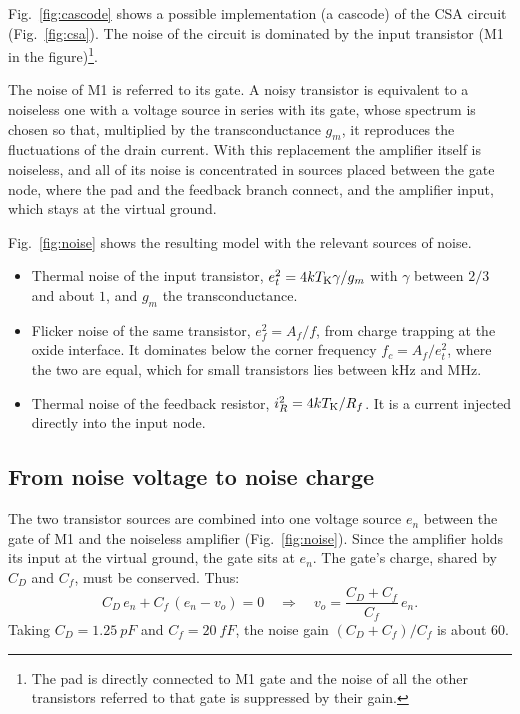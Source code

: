 \documentclass[11pt,a4paper]{article}
\newcommand{\CD}{\ensuremath{C_D}}
\newcommand{\Cf}{\ensuremath{C_f}}
\begin{document}
Fig.~\ref{fig:cascode} shows a possible implementation (a cascode) of the CSA circuit (Fig.~\ref{fig:csa}). 
The noise of
the circuit is dominated by the input transistor (M1 in the figure)\footnote{The
pad is directly connected to M1 gate and the noise of all the other transistors
referred to that gate is suppressed by their
gain.}.

The noise of M1 is referred to its gate. A noisy transistor is equivalent
to a noiseless one with a voltage source in series with its gate, whose
spectrum is chosen so that, multiplied by the transconductance $g_m$, it
reproduces the fluctuations of the drain current. With this replacement
the amplifier itself is noiseless, and all of its noise is concentrated in
sources placed between the gate node, where the pad and the feedback
branch connect, and the amplifier input, which stays at the virtual ground.

Fig.~\ref{fig:noise} shows the resulting model with the relevant sources
of noise. 
%
\begin{itemize}
\item Thermal noise of the input transistor, $e_t^2 = 4kT_{\rm K}\gamma/g_m$
with $\gamma$ between $2/3$ and about $1$, and $g_m$ the transconductance.
\item Flicker noise of the same transistor, $e_f^2=A_f/f$, from charge
  trapping at the oxide interface. It dominates below the corner frequency
  $f_c=A_f/e_t^2$, where the two are equal, which for small transistors lies
  between \si{kHz} and \si{MHz}.
\item Thermal noise of the feedback resistor, $i_R^2=4kT_{\rm K}/R_f$. It is a
  current injected directly into the input node.
\end{itemize}

\subsection{From noise voltage to noise charge}
%
The two transistor sources are combined into one
voltage source $e_n$ between the gate of M1 and the noiseless amplifier
(Fig.~\ref{fig:noise}). Since the amplifier holds its input at the virtual
ground, the gate sits at $e_n$. The gate's charge, shared by $\CD$ and $\Cf$, must be conserved. Thus:
%
\[
 \CD\,e_n + \Cf\,(e_n-v_o) = 0
 \quad\Rightarrow\quad
 v_o = \frac{\CD+\Cf}{\Cf}\,e_n .
\]
%
Taking $\CD= \SI{1.25}{pF}$ and $\Cf=\SI{20}{fF}$, the noise gain
$(\CD+\Cf)/\Cf$ is about 60. 
\end{document}
